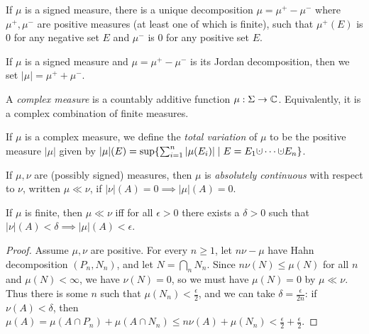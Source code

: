 \begin{thm} If $\mu$ is a signed measure, there is a unique decomposition $\mu = \mu^+ - \mu^-$ where $\mu^+, \mu^-$ are positive measures (at least one of which is finite), such that $\mu^+(E)$ is $0$ for any negative set $E$ and $\mu^-$ is $0$ for any positive set $E$.
\end{thm}

\begin{defn} If $\mu$ is a signed measure and $\mu = \mu^+ - \mu^-$ is its Jordan decomposition, then we set $|\mu| = \mu^+ + \mu^-$.
\end{defn}

\begin{defn} A \emph{complex measure} is a countably additive function $\mu:\Sigma \rightarrow \mathbb{C}$. Equivalently, it is a complex combination of finite measures.
\end{defn}

\begin{defn} If $\mu$ is a complex measure, we define the \emph{total variation} of $\mu$ to be the positive measure $|\mu|$ given by $|\mu|(E) = \sup\{\sum_{i=1}^n |\mu(E_i)| \mid E = E_1 \dotcup \cdots \dotcup E_n\}$.
\end{defn}

\begin{defn} If $\mu, \nu$ are (possibly signed) measures, then $\mu$ is \emph{absolutely continuous} with respect to $\nu$, written $\mu \ll \nu$, if $|\nu|(A) = 0 \implies |\mu|(A) = 0$.
\end{defn}

\begin{prop}\label{absolutely-continuous} If $\mu$ is finite, then $\mu \ll \nu$ iff for all $\epsilon > 0$ there exists a $\delta > 0$ such that $|\nu|(A) < \delta \implies |\mu|(A) < \epsilon$.
\end{prop}
\begin{proof} Assume $\mu, \nu$ are positive. For every $n \ge 1$, let $n\nu - \mu$ have Hahn decomposition $(P_n,N_n)$, and let $N = \bigcap_n N_n$. Since $n\nu(N) \le \mu(N)$ for all $n$ and $\mu(N) < \infty$, we have $\nu(N) = 0$, so we must have $\mu(N) = 0$ by $\mu \ll \nu$. Thus there is some $n$ such that $\mu(N_n) < \frac{\epsilon}{2}$, and we can take $\delta = \frac{\epsilon}{2n}$: if $\nu(A) < \delta$, then $\mu(A) = \mu(A\cap P_n) + \mu(A\cap N_n) \le n\nu(A) + \mu(N_n) < \frac{\epsilon}{2} + \frac{\epsilon}{2}$.
\end{proof}


